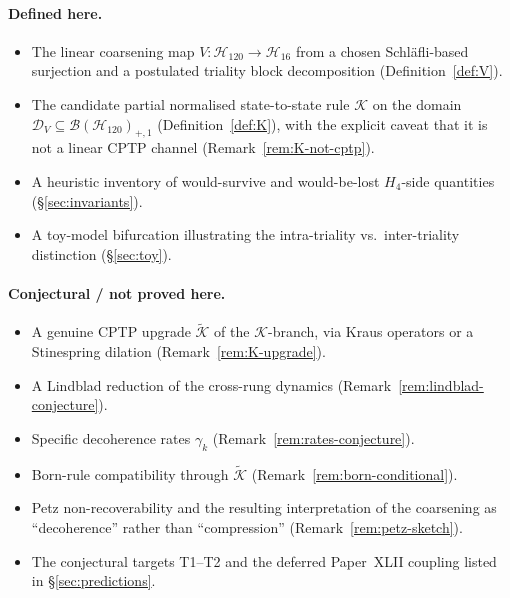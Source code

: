 \documentclass[12pt]{article}
\theoremstyle{definition}
\theoremstyle{remark}
\newcommand{\Hcal}{\mathcal{H}}
\newcommand{\Kcal}{\mathcal{K}}
\newcommand{\Dcal}{\mathcal{D}}
\begin{document}
\paragraph{Defined here.}
\begin{itemize}
\item The linear coarsening map $V: \Hcal_{120} \to \Hcal_{16}$ from a chosen Schl\"afli-based surjection and a postulated triality block decomposition (Definition~\ref{def:V}).
\item The candidate partial normalised state-to-state rule $\Kcal$ on the domain $\Dcal_V \subseteq \mathcal{B}(\Hcal_{120})_{+,1}$ (Definition~\ref{def:K}), with the explicit caveat that it is not a linear CPTP channel (Remark~\ref{rem:K-not-cptp}).
\item A heuristic inventory of would-survive and would-be-lost $H_4$-side quantities (\S\ref{sec:invariants}).
\item A toy-model bifurcation illustrating the intra-triality vs.\ inter-triality distinction (\S\ref{sec:toy}).
\end{itemize}

\paragraph{Conjectural / not proved here.}
\begin{itemize}
\item A genuine CPTP upgrade $\widetilde{\Kcal}$ of the $\Kcal$-branch, via Kraus operators or a Stinespring dilation (Remark~\ref{rem:K-upgrade}).
\item A Lindblad reduction of the cross-rung dynamics (Remark~\ref{rem:lindblad-conjecture}).
\item Specific decoherence rates $\gamma_k$ (Remark~\ref{rem:rates-conjecture}).
\item Born-rule compatibility through $\widetilde{\Kcal}$ (Remark~\ref{rem:born-conditional}).
\item Petz non-recoverability and the resulting interpretation of the coarsening as ``decoherence'' rather than ``compression'' (Remark~\ref{rem:petz-sketch}).
\item The conjectural targets T1--T2 and the deferred Paper~XLII coupling listed in \S\ref{sec:predictions}.
\end{itemize}
\end{document}
